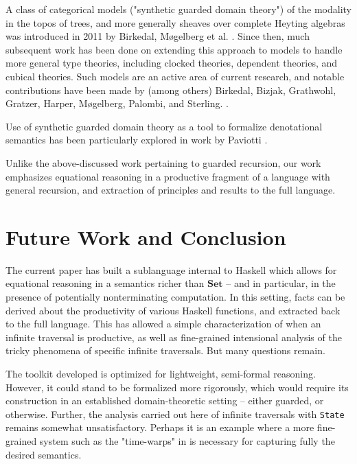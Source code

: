 \documentclass[sigplan,screen]{acmart}
\newcommand{\hs}{\texttt}
\begin{document}
A class of categorical models ("synthetic guarded domain theory") of the modality in the topos of trees, and more generally sheaves over complete Heyting algebras was introduced in 2011 by Birkedal, Møgelberg et al. \cite{birkedal2011first}. Since then, much subsequent work has been done on extending this approach to models to handle more general type theories, including clocked theories, dependent theories, and cubical theories. Such models are an active area of current research, and notable contributions have been made by (among others) Birkedal, Bizjak, Grathwohl, Gratzer, Harper, Møgelberg, Palombi, and Sterling. \cite{gratzer-birkedal:2022, sterling-harper:2018, bbcgsv:2019, bizjak2020denotational, palombi-sterling:2022}.

Use of synthetic guarded domain theory as a tool to formalize denotational semantics has been particularly explored in work by Paviotti \cite{paviotti:2016, mogelberg-paviotti:2016, paviotti-mogelberg-birkedal:2015}.

Unlike the above-discussed work pertaining to guarded recursion, our work emphasizes equational reasoning in a productive fragment of a language with general recursion, and extraction of principles and results to the full language.


\section{Future Work and Conclusion}

The current paper has built a sublanguage internal to Haskell which allows for equational reasoning in a semantics richer than $\mathbf{Set}$ -- and in particular, in the presence of potentially nonterminating computation. In this setting, facts can be derived about the productivity of various Haskell functions, and extracted back to the full language. This has allowed a simple characterization of when an infinite traversal is productive, as well as fine-grained intensional analysis of the tricky phenomena of specific infinite traversals. But many questions remain.

The toolkit developed is optimized for lightweight, semi-formal reasoning. However, it could stand to be formalized more rigorously, which would require its construction in an established domain-theoretic setting -- either guarded, or otherwise.  Further, the analysis carried out here of infinite traversals with \hs{State} remains somewhat unsatisfactory. Perhaps it is an example where a more fine-grained system such as the "time-warps" in \cite{guatto:2018} is necessary for capturing fully the desired semantics.
\end{document}
